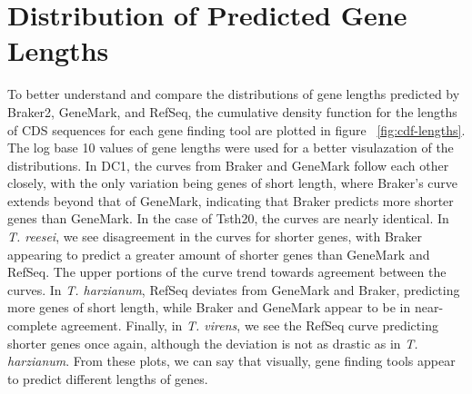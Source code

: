 \section{Distribution of Predicted Gene Lengths}

To better understand and compare the distributions of gene lengths
predicted by Braker2, GeneMark, and RefSeq, the cumulative density
function for the lengths of CDS sequences for each gene finding tool
are plotted in figure ~\ref{fig:cdf-lengths}. The log base 10 values
of gene lengths were used for a better visulazation of the
distributions. In DC1, the curves from Braker and GeneMark follow each
other closely, with the only variation being genes of short length,
where Braker's curve extends beyond that of GeneMark, indicating that
Braker predicts more shorter genes than GeneMark. In the case of
Tsth20, the curves are nearly identical. In \textit{T. reesei}, we see
disagreement in the curves for shorter genes, with Braker appearing to
predict a greater amount of shorter genes than GeneMark and
RefSeq. The upper portions of the curve trend towards agreement
between the curves. In \textit{T. harzianum}, RefSeq deviates from
GeneMark and Braker, predicting more genes of short length, while
Braker and GeneMark appear to be in near-complete agreement. Finally,
in \textit{T. virens}, we see the RefSeq curve predicting shorter
genes once again, although the deviation is not as drastic as in
\textit{T. harzianum}. From these plots, we can say that visually,
gene finding tools appear to predict different lengths of genes.

